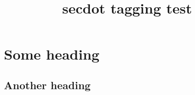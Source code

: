 \documentclass{article}
\title{secdot tagging test}
\begin{document}
\section{Some heading}
\subsection{Another heading}
\end{document}
